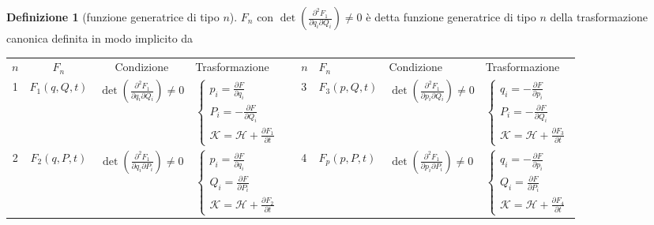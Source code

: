 \documentclass[a4paper,10pt]{article}
\theoremstyle{definition}
\providecommand{\tabularnewline}{\\}
\theoremstyle{indentdefinition}
\newtheorem{defn}{Definizione}[section]
\theoremstyle{indenttheorem}
\theoremstyle{myremark}
\theoremstyle{indentgeneral}
\begin{document}
\begin{defn}[funzione generatrice di tipo $n$]
$F_{n}$ con $\det\left(\frac{\partial^{2}F_{1}}{\partial q_{i}\partial Q_{i}}\right)\neq0$
è detta funzione generatrice di tipo $n$ della trasformazione canonica
definita in modo implicito da
\begin{center}
\begin{tabular}{cccl>{\raggedright}p{0.2cm}llll}
\cmidrule{1-4} \cmidrule{2-4} \cmidrule{3-4} \cmidrule{4-4} \cmidrule{6-9} \cmidrule{7-9} \cmidrule{8-9} \cmidrule{9-9} 
$n$ & $F_{n}$ & Condizione & Trasformazione &  & $n$ & $F_{n}$ & Condizione & Trasformazione\tabularnewline
\cmidrule{1-4} \cmidrule{2-4} \cmidrule{3-4} \cmidrule{4-4} \cmidrule{6-9} \cmidrule{7-9} \cmidrule{8-9} \cmidrule{9-9} 
1 & $F_{1}\left(q,Q,t\right)$ & $\det\left(\frac{\partial^{2}F_{1}}{\partial q_{i}\partial Q_{i}}\right)\neq0$ & $\begin{cases}
p_{i}=\frac{\partial F}{\partial q_{i}}\\
P_{i}=-\frac{\partial F}{\partial Q_{i}}\\
\mathcal{K}=\mathcal{H}+\frac{\partial F_{1}}{\partial t}
\end{cases}$ &  & 3 & $F_{3}\left(p,Q,t\right)$ & $\det\left(\frac{\partial^{2}F_{1}}{\partial p_{i}\partial Q_{i}}\right)\neq0$ & $\begin{cases}
q_{i}=-\frac{\partial F}{\partial p_{i}}\\
P_{i}=-\frac{\partial F}{\partial Q_{i}}\\
\mathcal{K}=\mathcal{H}+\frac{\partial F_{3}}{\partial t}
\end{cases}$\tabularnewline
\cmidrule{1-4} \cmidrule{2-4} \cmidrule{3-4} \cmidrule{4-4} \cmidrule{6-9} \cmidrule{7-9} \cmidrule{8-9} \cmidrule{9-9} 
2 & $F_{2}\left(q,P,t\right)$ & $\det\left(\frac{\partial^{2}F_{1}}{\partial q_{i}\partial P_{i}}\right)\neq0$ & $\begin{cases}
p_{i}=\frac{\partial F}{\partial q_{i}}\\
Q_{i}=\frac{\partial F}{\partial P_{i}}\\
\mathcal{K}=\mathcal{H}+\frac{\partial F_{2}}{\partial t}
\end{cases}$ &  & 4 & $F_{p}\left(p,P,t\right)$ & $\det\left(\frac{\partial^{2}F_{1}}{\partial p_{i}\partial P_{i}}\right)\neq0$ & $\begin{cases}
q_{i}=-\frac{\partial F}{\partial p_{i}}\\
Q_{i}=\frac{\partial F}{\partial P_{i}}\\
\mathcal{K}=\mathcal{H}+\frac{\partial F_{4}}{\partial t}
\end{cases}$\tabularnewline
\cmidrule{1-4} \cmidrule{2-4} \cmidrule{3-4} \cmidrule{4-4} \cmidrule{6-9} \cmidrule{7-9} \cmidrule{8-9} \cmidrule{9-9} 
\end{tabular}
\par\end{center}
\end{defn}
\end{document}
